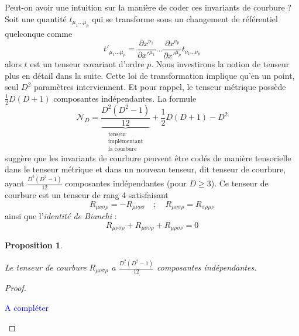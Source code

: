 \documentclass[a4paper,11pt]{report}
\theoremstyle{definition}
\theoremstyle{plain}
\newtheorem{prop}[thm]{Proposition}
\theoremstyle{definition}
\theoremstyle{remark}
\newcommand{\comp}{\begin{center}\textcolor{blue}{A compléter}\end{center}}
\newcommand{\p}{\partial}
\begin{document}
            Peut-on avoir une intuition sur la manière de coder ces invariants de courbure ? Soit une quantité $t_{\mu_1\dots\mu_p}$ qui se transforme sous un changement de référentiel quelconque comme
            \begin{equation}
                t'_{\mu_1\dots\mu_p} = \frac{\p x^{\nu_1}}{\p x'^{\mu_1}}\dots\frac{\p x^{\nu_p}}{\p x'^{\mu_p}} t_{\nu_1\dots\nu_p}
            \end{equation}
            alors $t$ est un tenseur covariant d'ordre $p$. Nous investirons la notion de tenseur plus en détail dans la suite. Cette loi de transformation implique qu'en un point, seul $D^2$ paramètres interviennent. Et pour rappel, le tenseur métrique possède $\frac{1}{2}D(D+1)$ composantes indépendantes. La formule
            \begin{equation}
                \mathscr{N}_D =  \underbrace{\frac{D^2(D^2-1)}{12}}_{\substack{\text{tenseur}\\ \text{implémentant} \\ \text{la courbure}}}+\frac{1}{2}D(D+1)-D^2
            \end{equation}
            suggère que les invariants de courbure peuvent être codés de manière tensorielle dans le tenseur métrique et dans un nouveau tenseur, dit tenseur de courbure, ayant $\frac{D^2(D^2-1)}{12}$ composantes indépendantes (pour $D\geq3$). Ce tenseur de courbure est un tenseur de rang 4 satisfaisant 
            \begin{equation}
                R_{\mu\nu\sigma\rho} = -R_{\mu\nu\rho\sigma}\quad ; \quad R_{\mu\nu\sigma\rho} = R_{\sigma\rho\mu\nu}
            \end{equation}
            ainsi que l'\textit{identité de Bianchi} :
            \begin{equation}
                R_{\mu\nu\sigma\rho}+R_{\mu\sigma\nu\rho}+R_{\mu\rho\sigma\nu} = 0
            \end{equation}
            
            \begin{prop}\begin{leftbar}
                Le tenseur de courbure $R_{\mu\nu\sigma\rho}$ a $\frac{D^2(D^2-1)}{12}$ composantes indépendantes.
            \end{leftbar}\end{prop}
            
            \begin{proof}${}$\\
                \comp
            \end{proof}
            
\end{document}
